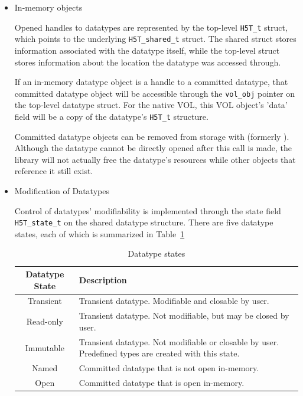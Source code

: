 

\begin{itemize}
    \item In-memory objects

Opened handles to datatypes are represented by the top-level \texttt{H5T\_t} struct, which points to the underlying \texttt{H5T\_shared\_t} struct. The shared struct stores information associated with the datatype itself, while the top-level struct stores information about the location the datatype was accessed through.

If an in-memory datatype object is a handle to a committed datatype, that committed datatype object will be accessible through the \texttt{vol\_obj} pointer on the top-level datatype struct. For the native VOL, this VOL object's 'data' field will be a copy of the datatype's \texttt{H5T\_t} structure.

Committed datatype objects can be removed from storage with  (formerly ). Although the datatype cannot be directly opened after this call is made, the library will not actually free the datatype's resources while other objects that reference it still exist.

    \item Modification of Datatypes

Control of datatypes' modifiability is implemented through the state field \texttt{H5T\_state\_t} on the shared datatype structure. There are five datatype states, each of which is summarized in Table~\ref{table:datatype-states}

\begin{table}[h!]
\begin{tabular}{||c|m{}||}
\hline
\textbf{Datatype State} & \textbf{Description} \\  [0.5ex]
\hline\hline
Transient & Transient datatype. Modifiable and closable by user. \\
\hline
Read-only & Transient datatype. Not modifiable, but may be closed by user.  \\
\hline
Immutable & Transient datatype. Not modifiable or closable by user. Predefined types are created with this state. \\
\hline
Named & Committed datatype that is not open in-memory. \\
\hline
Open & Committed datatype that is open in-memory. \\
\hline
\end{tabular}
\caption{Datatype states}
\label{table:datatype-states}
\end{table}


\end{itemize}
